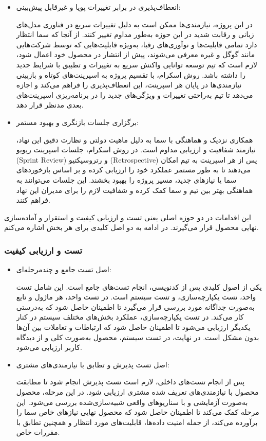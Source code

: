 \begin{itemize}
    \item انعطاف‌پذیری در برابر تغییرات پویا و غیرقابل پیش‌بینی: 
    
    در این پروژه، نیازمندی‌ها ممکن است به دلیل تغییرات سریع در فناوری مدل‌های زبانی و رقابت شدید در این حوزه به‌طور مداوم تغییر کنند. از آنجا که سما انتظار دارد تمامی قابلیت‌ها و نوآوری‌های رقبا، به‌ویژه قابلیت‌هایی که توسط شرکت‌هایی مانند گوگل و غیره معرفی می‌شوند، پیش از انتشار در محصول خود اعمال شود، لازم است که تیم توسعه توانایی واکنش سریع به تغییرات و تطبیق با شرایط جدید را داشته باشد. روش اسکرام، با تقسیم پروژه به اسپرینت‌های کوتاه و بازبینی نیازمندی‌ها در پایان هر اسپرینت، این انعطاف‌پذیری را فراهم می‌کند و اجازه می‌دهد تا تیم به‌راحتی تغییرات و ویژگی‌های جدید را در برنامه‌ریزی اسپرینت‌های بعدی مدنظر قرار دهد.
    \item برگزاری جلسات بازنگری و بهبود مستمر: 
    
    همکاری نزدیک و هماهنگی با سما به دلیل ماهیت دولتی و نظارت دقیق این نهاد، نیازمند شفافیت و ارزیابی مداوم است. در روش اسکرام، جلسات اسپرینت ریویو (Sprint Review) و رتروسپکتیو (Retrospective) پس از هر اسپرینت به تیم امکان می‌دهند تا به طور مستمر عملکرد خود را ارزیابی کرده و بر اساس بازخوردهای سما یا نیازهای جدید، مسیر پروژه را بهبود بخشند. این جلسات می‌توانند به هماهنگی بهتر بین تیم و سما کمک کرده و شفافیت لازم را برای مدیران این نهاد فراهم کنند.
\end{itemize}


این اقدامات در دو حوزه اصلی یعنی تست و ارزیابی کیفیت و استقرار و آماده‌سازی نهایی محصول قرار می‌گیرند. در ادامه به دو اصل کلیدی برای هر بخش اشاره می‌کنم.

\subsubsection*{تست و ارزیابی کیفیت}
\begin{itemize}
    \item
    اصل تست جامع و چندمرحله‌ای:
    
    یکی از اصول کلیدی پس از کدنویسی، انجام تست‌های جامع است. این شامل تست واحد، تست یکپارچه‌سازی، و تست سیستم است. در تست واحد، هر ماژول و تابع به‌صورت جداگانه مورد بررسی قرار می‌گیرد تا اطمینان حاصل شود که به‌درستی کار می‌کند. در تست یکپارچه‌سازی، عملکرد بخش‌های مختلف سیستم در کنار یکدیگر ارزیابی می‌شود تا اطمینان حاصل شود که ارتباطات و تعاملات بین آن‌ها بدون مشکل است. در نهایت، در تست سیستم، محصول به‌صورت کلی و از دیدگاه کاربر ارزیابی می‌شود.
    
    \item
    اصل تست پذیرش و تطابق با نیازمندی‌های مشتری: 
    
    پس از انجام تست‌های داخلی، لازم است تست پذیرش انجام شود تا مطابقت محصول با نیازمندی‌های تعریف‌ شده مشتری ارزیابی شود. در این مرحله، محصول به‌صورت آزمایشی و با سناریوهای واقعی شبیه‌سازی‌شده بررسی می‌شود. این مرحله کمک می‌کند تا اطمینان حاصل شود که محصول نهایی نیازهای خاص سما را برآورده می‌کند، از جمله امنیت داده‌ها، قابلیت‌های مورد انتظار و همچنین تطابق با مقررات خاص.
\end{itemize}

